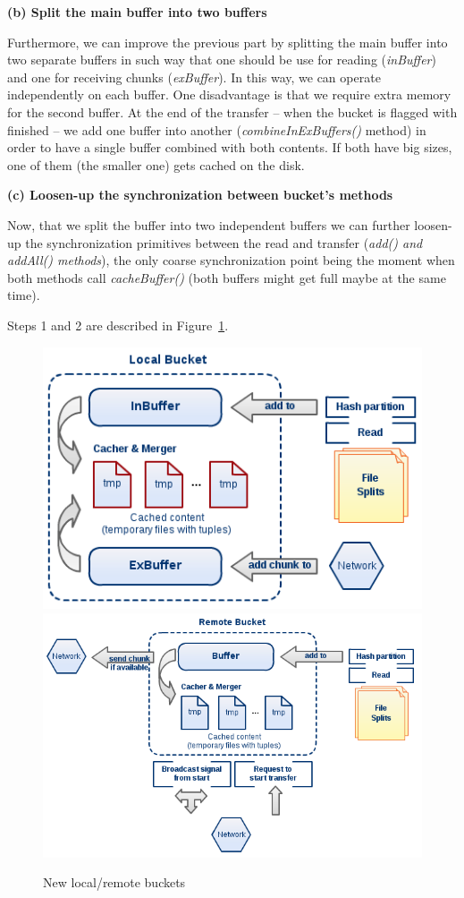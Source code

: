 \textbf{(b) Split the main buffer into two buffers}

Furthermore, we can improve the previous part by splitting the main buffer into two separate buffers in such way that one should be use for reading (\textit{inBuffer}) and one for receiving chunks (\textit{exBuffer}). In this way, we can operate independently on each buffer. One disadvantage is that we require extra memory for the second buffer. At the end of the transfer -- when the bucket is flagged with finished -- we add one buffer into another (\textit{combineInExBuffers()} method) in order to have a single buffer combined with both contents. If both have big sizes, one of them (the smaller one) gets cached on the disk.

\textbf{(c) Loosen-up the synchronization between bucket's methods}

Now, that we split the buffer into two independent buffers we can further loosen-up the synchronization primitives between the read and transfer (\textit{add() and addAll() methods}), the only coarse synchronization point being the moment when both methods call \textit{cacheBuffer()} (both buffers might get full maybe at the same time).

Steps 1 and 2 are described in Figure~\ref{fig:diag4}.

\pagebreak

\begin{figure}
\centering
\includegraphics[scale=0.6]{diag4a}
\linebreak
\linebreak
\centering
\includegraphics[scale=0.6]{diag4b}
\caption{New local/remote buckets}
\label{fig:diag4}
\end{figure}

